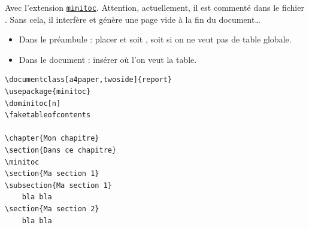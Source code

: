 Avec l'extension \href{http://mirror.ctan.org/macros/latex/contrib/minitoc/minitoc-fr.pdf}{\texttt{minitoc}}. Attention, actuellement, il est commenté dans le fichier . Sans cela, il interfère et génère une page vide à la fin du document\dots

\begin{itemize}
	\item Dans le préambule : placer \texttt{\dominitoc[n]} et soit \texttt{\tableofcontents}, soit \texttt{\faketableofcontents} si on ne veut pas de table globale.
	\item Dans le document : insérer \texttt{\minitoc} où l'on veut la table.
\end{itemize}

\begin{minipage}{.48\linewidth}
	\begin{verbatim}
\documentclass[a4paper,twoside]{report}
\usepackage{minitoc}
\dominitoc[n]
\faketableofcontents

\chapter{Mon chapitre}
\section{Dans ce chapitre}
\minitoc
\section{Ma section 1}
\subsection{Ma section 1}
    bla bla
\section{Ma section 2}
    bla bla

	\end{verbatim}
\end{minipage}
\hfill
